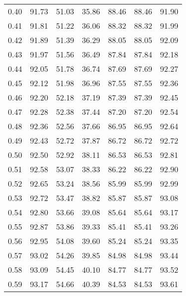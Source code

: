 \begin{tabular}{|c|c|c|c|c|c|c|}
      0.40 &     91.73 &     51.03 &      35.86 &   88.46 &      88.46 &         91.90 \\
      0.41 &     91.81 &     51.22 &      36.06 &   88.32 &      88.32 &         91.99 \\
      0.42 &     91.89 &     51.39 &      36.29 &   88.05 &      88.05 &         92.09 \\
      0.43 &     91.97 &     51.56 &      36.49 &   87.84 &      87.84 &         92.18 \\
      0.44 &     92.05 &     51.78 &      36.74 &   87.69 &      87.69 &         92.27 \\
      0.45 &     92.12 &     51.98 &      36.96 &   87.55 &      87.55 &         92.36 \\
      0.46 &     92.20 &     52.18 &      37.19 &   87.39 &      87.39 &         92.45 \\
      0.47 &     92.28 &     52.38 &      37.44 &   87.20 &      87.20 &         92.54 \\
      0.48 &     92.36 &     52.56 &      37.66 &   86.95 &      86.95 &         92.64 \\
      0.49 &     92.43 &     52.72 &      37.87 &   86.72 &      86.72 &         92.72 \\
      0.50 &     92.50 &     52.92 &      38.11 &   86.53 &      86.53 &         92.81 \\
      0.51 &     92.58 &     53.07 &      38.33 &   86.22 &      86.22 &         92.90 \\
      0.52 &     92.65 &     53.24 &      38.56 &   85.99 &      85.99 &         92.99 \\
      0.53 &     92.72 &     53.47 &      38.82 &   85.87 &      85.87 &         93.08 \\
      0.54 &     92.80 &     53.66 &      39.08 &   85.64 &      85.64 &         93.17 \\
      0.55 &     92.87 &     53.86 &      39.33 &   85.41 &      85.41 &         93.26 \\
      0.56 &     92.95 &     54.08 &      39.60 &   85.24 &      85.24 &         93.35 \\
      0.57 &     93.02 &     54.26 &      39.85 &   84.98 &      84.98 &         93.44 \\
      0.58 &     93.09 &     54.45 &      40.10 &   84.77 &      84.77 &         93.52 \\
      0.59 &     93.17 &     54.66 &      40.39 &   84.53 &      84.53 &         93.61 \\

\end{tabular}
